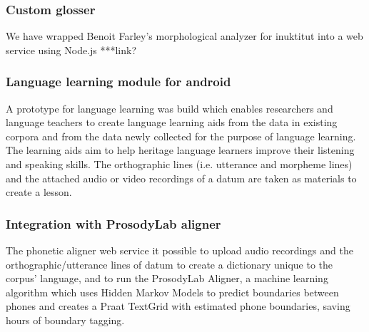 \documentclass[letterpaper, 12pt, dvips]{mitwpl}
\begin{document}


\subsubsection{Custom glosser}

We have wrapped Benoit Farley's morphological analyzer for inuktitut into a web service using Node.js ***link?

\subsubsection{Language learning module for android}

A prototype for language learning was build which  enables researchers and language teachers to create language learning aids from the data in existing corpora and from the data newly collected for the purpose of language learning. The learning aids aim to help heritage language learners improve their listening and speaking skills. The orthographic lines (i.e. utterance and morpheme lines) and the attached audio or video recordings of a datum are taken as materials to create a lesson. 

\subsubsection{Integration with ProsodyLab aligner}
\label{sec:phoneticwebservice}

The phonetic aligner web service it possible to upload audio recordings and the orthographic/utterance lines of datum to create a dictionary unique to the corpus' language, and to run the ProsodyLab Aligner, a machine learning algorithm which uses Hidden Markov Models to predict boundaries between phones and creates a Praat TextGrid with estimated phone boundaries, saving hours of boundary tagging.
\end{document}

